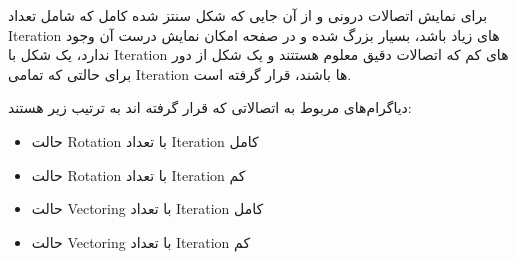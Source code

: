 \documentclass[12pt,titlepage,a4page , tikz , multi,table , svgnames,xcdraw]{article}
\begin{document}
برای نمایش اتصالات درونی و از آن جایی که شکل سنتز شده کامل که شامل تعداد Iteration های زیاد باشد، بسیار بزرگ شده و در صفحه امکان نمایش درست آن وجود ندارد، یک شکل با Iteration های کم که اتصالات دقیق معلوم هستتند و یک شکل از دور برای حالتی که تمامی Iteration ها باشند، قرار گرفته است.

دیاگرام‌های مربوط به اتصالاتی که قرار گرفته اند به ترتیب زیر هستند:


\begin{itemize}

\item
حالت Rotation با تعداد Iteration کامل

\item
حالت Rotation با تعداد Iteration کم

\item
حالت Vectoring با تعداد Iteration کامل

\item
حالت Vectoring با تعداد Iteration کم


\end{itemize}

\newpage

\begin{landscape}

\thispagestyle{empty}




\end{landscape}


\newpage

\begin{landscape}

\thispagestyle{empty}


\end{landscape}
\newpage

\begin{landscape}

\thispagestyle{empty}


\end{landscape}
\newpage


\begin{landscape}

\thispagestyle{empty}


\end{landscape}
\newpage




\begin{landscape}
\thispagestyle{empty}


\end{landscape}
\end{document}
